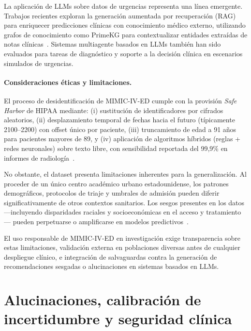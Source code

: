 La aplicación de \ac{LLM}s sobre datos de urgencias representa una línea emergente. Trabajos recientes exploran la generación aumentada por recuperación (\ac{RAG}) para enriquecer predicciones clínicas con conocimiento médico externo, utilizando grafos de conocimiento como PrimeKG para contextualizar entidades extraídas de notas clínicas~\parencite{zhu2024emerge}. Sistemas multiagente basados en \ac{LLM}s también han sido evaluados para tareas de diagnóstico y soporte a la decisión clínica en escenarios simulados de urgencias.

\paragraph{Consideraciones éticas y limitaciones.}

El proceso de desidentificación de \acs{MIMIC}-IV-\acs{ED} cumple con la provisión \textit{Safe Harbor} de \ac{HIPAA} mediante: (i) sustitución de identificadores por cifrados aleatorios, (ii) desplazamiento temporal de fechas hacia el futuro (típicamente 2100--2200) con offset único por paciente, (iii) truncamiento de edad a 91 años para pacientes mayores de 89, y (iv) aplicación de algoritmos híbridos (reglas + redes neuronales) sobre texto libre, con sensibilidad reportada del 99,9\% en informes de radiología~\parencite{johnson2023mimiciv,johnson2023mimicivnote}.

No obstante, el dataset presenta limitaciones inherentes para la generalización. Al proceder de un único centro académico urbano estadounidense, los patrones demográficos, protocolos de triaje y umbrales de admisión pueden diferir significativamente de otros contextos sanitarios. Los sesgos presentes en los datos ---incluyendo disparidades raciales y socioeconómicas en el acceso y tratamiento--- pueden perpetuarse o amplificarse en modelos predictivos~\parencite{park2024}.

El uso responsable de \acs{MIMIC}-IV-\acs{ED} en investigación exige transparencia sobre estas limitaciones, validación externa en poblaciones diversas antes de cualquier despliegue clínico, e integración de salvaguardas contra la generación de recomendaciones sesgadas o alucinaciones en sistemas basados en \ac{LLM}s.

\section{Alucinaciones, calibración de incertidumbre y seguridad clínica}
\label{sec:alucinaciones}

